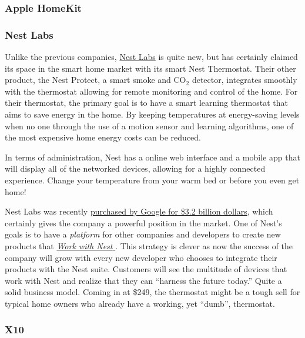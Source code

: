 \subsubsection{Apple HomeKit}

\subsubsection{Nest Labs}
Unlike the previous companies, \href{http://nest.com}{Nest Labs} is quite new,
but has certainly claimed its space in the smart home market with its smart
Nest Thermostat. Their other product, the Nest Protect, a smart smoke and
CO$_2$ detector, integrates smoothly with the thermostat allowing for remote
monitoring and control of the home. For their thermostat, the primary goal is
to have a smart learning thermostat that aims to save energy in the home. By
keeping temperatures at energy-saving levels when no one through the use of a
motion sensor and learning algorithms, one of the most expensive home energy
costs can be reduced.

In terms of administration, Nest has a online web interface and a mobile app
that will display all of the networked devices, allowing for a highly connected
experience. Change your temperature from your warm bed or before you even get home!

Nest Labs was recently
\href{http://www.forbes.com/sites/greatspeculations/2014/01/17/googles-strategy-behind-the-3-2-billion-acquisition-of-nest-labs/}{purchased by Google for \$3.2 billion dollars},
which certainly gives the company a powerful position in the market. One of
Nest's goals is to have a \emph{platform} for other companies and developers to
create new products that \href{https://nest.com/works-with-nest/}{\emph{Work with Nest \texttrademark}}. This strategy is
clever as now the success of the company will grow with every new
developer who chooses to integrate their products with the Nest suite.
Customers will see the multitude of devices that work with Nest and realize
that they can ``harness the future today.'' Quite a solid business model.
Coming in at \$249, the thermostat might be a tough sell for typical home owners who
already have a working, yet ``dumb'', thermostat.

\subsubsection{X10}

